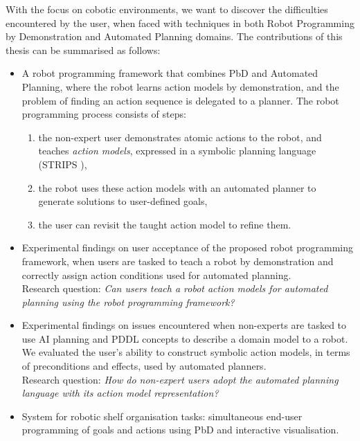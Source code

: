 With the focus on cobotic environments, we want to discover the difficulties encountered by the user, when faced with techniques in both Robot Programming by Demonstration and Automated Planning domains.
The contributions of this thesis can be summarised as follows:
\begin{itemize}
	\item {A robot programming framework that combines PbD and Automated Planning, where the robot learns action models by demonstration, and the problem of finding an action sequence is delegated to a planner.
	The robot programming process consists of steps:
	\begin{enumerate}
		\item the non-expert user demonstrates atomic actions to the robot, and teaches \textit{action models}, expressed in a symbolic planning language (STRIPS \cite{fikes1971strips}),
		\item the robot uses these action models with an automated planner to generate solutions to user-defined goals,
		\item the user can revisit the taught action model to refine them.
	\end{enumerate}}
    \item {Experimental findings on user acceptance of the proposed robot programming framework, when users are tasked to teach a robot by demonstration and correctly assign action conditions used for automated planning. \\
    Research question: \textit{Can users teach a robot action models for automated planning using the robot programming framework?}}
    \item {Experimental findings on issues encountered when non-experts are tasked to use AI planning and PDDL concepts to describe a domain model to a robot. 
    	We evaluated the user's ability to construct symbolic action models, in terms of preconditions and effects, used by automated planners.\\ 
    Research question: \textit{How do non-expert users adopt the automated planning language with its action model representation?}}
    \item {System for robotic shelf organisation tasks: simultaneous end-user programming of goals and actions using PbD and interactive visualisation. }
\end{itemize}
